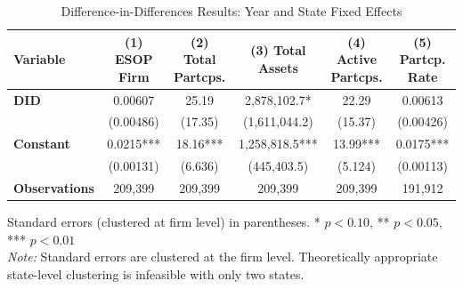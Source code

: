 \documentclass[12pt]{article}
\begin{document}
\begin{table}[H]
\centering
\caption{Difference-in-Differences Results: Year and State Fixed Effects}
\label{tab:model1}
\footnotesize

\begin{tabular}{lccccc}
\toprule
Variable & (1) ESOP Firm & (2) Total Partcps. & (3) Total Assets & (4) Active Partcps. & (5) Partcp. Rate \\
\midrule
\textbf{DID} & 0.00607 & 25.19 & 2,878,102.7* & 22.29 & 0.00613 \\
             & (0.00486) & (17.35) & (1,611,044.2) & (15.37) & (0.00426) \\
\textbf{Constant} & 0.0215*** & 18.16*** & 1,258,818.5*** & 13.99*** & 0.0175*** \\
                  & (0.00131) & (6.636) & (445,403.5) & (5.124) & (0.00113) \\
\midrule
\textbf{Observations} & 209,399 & 209,399 & 209,399 & 209,399 & 191,912 \\
\bottomrule
\end{tabular}

\vspace{0.5em}
{\footnotesize Standard errors (clustered at firm level) in parentheses. * $p<0.10$, ** $p<0.05$, *** $p<0.01$ \\
\textit{Note:} Standard errors are clustered at the firm level. Theoretically appropriate state-level clustering is infeasible with only two states.}
\end{table}
\end{document}
